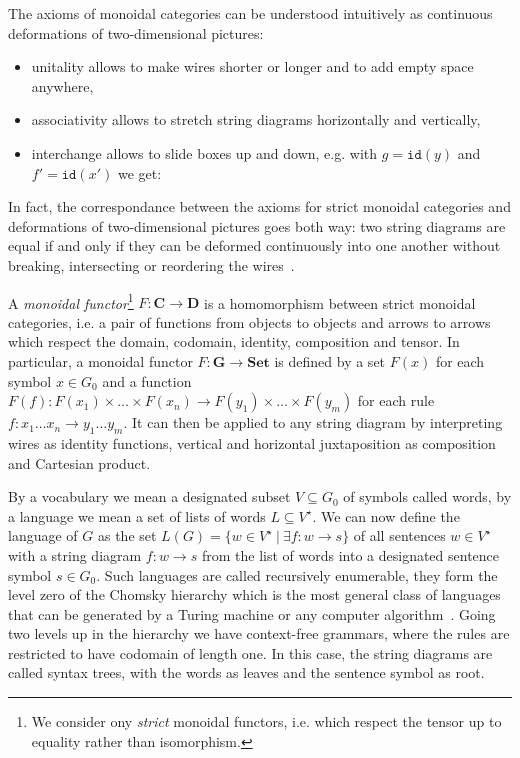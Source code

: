 The axioms of monoidal categories can be understood intuitively as continuous deformations of two-dimensional pictures:
\begin{itemize}
\item unitality allows to make wires shorter or longer and to add empty space anywhere,
\item associativity allows to stretch string diagrams horizontally and vertically,
\item interchange allows to slide boxes up and down, e.g. with $g = \mathtt{id}(y)$ and $f' = \mathtt{id}(x')$ we get:
\end{itemize}
\begin{center}

\end{center}
In fact, the correspondance between the axioms for strict monoidal categories and deformations of two-dimensional pictures goes both way: two string diagrams are equal if and only if they can be deformed continuously into one another without breaking, intersecting or reordering the wires~\cite{JoyalStreet88}.

A \emph{monoidal functor}\footnote
{We consider ony \emph{strict} monoidal functors, i.e. which respect the tensor up to equality rather than isomorphism.}
$F : \mathbf{C} \to \mathbf{D}$ is a homomorphism between strict monoidal categories, i.e. a pair of functions from objects to objects and arrows to arrows which respect the domain, codomain, identity, composition and tensor.
In particular, a monoidal functor $F : \mathbf{G} \to \mathbf{Set}$ is defined by a set $F(x)$ for each symbol $x \in G_0$ and a function $F(f) : F(x_1) \times \dots \times F(x_n) \to F(y_1) \times \dots \times F(y_m)$ for each rule $f : x_1 \dots x_n \to y_1 \dots y_m$.
It can then be applied to any string diagram by interpreting wires as identity functions, vertical and horizontal juxtaposition as composition and Cartesian product.

By a vocabulary we mean a designated subset $V \subseteq G_0$ of symbols called words, by a language we mean a set of lists of words $L \subseteq V^\star$.
We can now define the language of $G$ as the set $L(G) = \{ w \in V^\star \ \vert \ \exists f : w \to s \}$ of all sentences $w \in V^\star$ with a string diagram $f : w \to s$ from the list of words into a designated sentence symbol $s \in G_0$.
Such languages are called recursively enumerable, they form the level zero of the Chomsky hierarchy which is the most general class of languages that can be generated by a Turing machine or any computer algorithm~\cite{Chomsky56}.
Going two levels up in the hierarchy we have context-free grammars, where the rules are restricted to have codomain of length one.
In this case, the string diagrams are called syntax trees, with the words as leaves and the sentence symbol as root.

